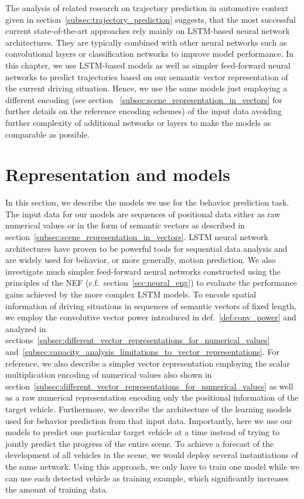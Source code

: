 The analysis of related research on trajectory prediction in automotive context given in section~\ref{subsec:trajectory_prediction} suggests, that the most successful current state-of-the-art approaches rely mainly on \ac{LSTM}-based neural network architectures.
They are typically combined with other neural networks such as convolutional layers or classification networks \parencite{Deo2018a} to improve model performance.
In this chapter, we use \ac{LSTM}-based models as well as simpler feed-forward neural networks to predict trajectories based on our semantic vector representation of the current driving situation.
Hence, we use the same models just employing a different encoding (see section ~\ref{subsec:scene_representation_in_vectors} for further details on the reference encoding schemes) of the input data avoiding further complexity of additional networks or layers to make the models as comparable as possible.

\section{Representation and models}
\label{sec:repr_models}

In this section, we describe the models we use for the behavior prediction task.
The input data for our models are sequences of positional data either as raw numerical values or in the form of semantic vectors as described in section~\ref{subsec:scene_representation_in_vectors}.
\ac{LSTM} neural network architectures have proven to be powerful tools for sequential data analysis and are widely used for behavior, or more generally, motion prediction.
We also investigate much simpler feed-forward neural networks constructed using the principles of the \acl{NEF} (c.f.\ section~\ref{sec:neural_eng}) to evaluate the performance gains achieved by the more complex \ac{LSTM} models.
To encode spatial information of driving situations in sequences of semantic vectors of fixed length, we employ the convolutive vector power introduced in def.~\ref{def:conv_power} and analyzed in sections~\ref{subsec:different_vector_representations_for_numerical_values} and~\ref{subsec:capacity_analysis_limitations_to_vector_representations}.
For reference, we also describe a simpler vector representation employing the scalar multiplication encoding of numerical values also shown in section~\ref{subsec:different_vector_representations_for_numerical_values} as well as a raw numerical representation encoding only the positional information of the target vehicle.  
Furthermore, we describe the architecture of the learning models used for behavior prediction from that input data.
Importantly, here we use our models to predict one particular target vehicle at a time instead of trying to jointly predict the progress of the entire scene.
To achieve a forecast of the development of all vehicles in the scene, we would deploy several instantiations of the same network.
Using this approach, we only have to train one model while we can use each detected vehicle as training example, which significantly increases the amount of training data. 

